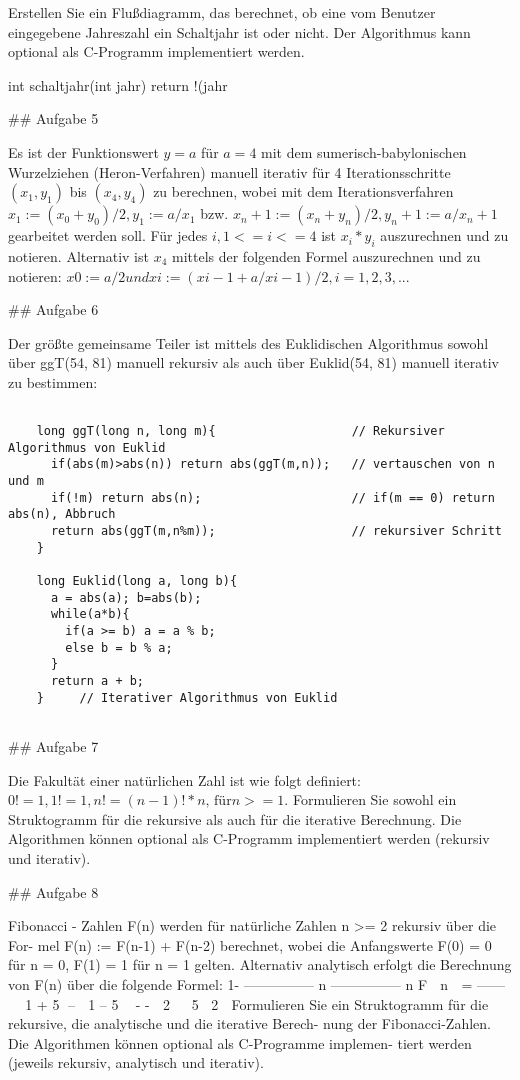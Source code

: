 Erstellen Sie ein Flußdiagramm, das berechnet, ob eine vom Benutzer eingegebene Jahreszahl ein Schaltjahr ist oder nicht. Der Algorithmus kann optional als C-Programm implementiert werden.

    int schaltjahr(int jahr){
      return !(jahr%
    }

## Aufgabe 5

Es ist der Funktionswert $ y = a $ für $ a = 4 $ mit dem sumerisch-babylonischen Wurzelziehen (Heron-Verfahren) manuell iterativ für 4 Iterationsschritte $ (x_1, y_1) $ bis $ (x_4, y_4) $ zu berechnen, wobei mit dem Iterationsverfahren $ x_1 := (x_0 + y_0) / 2 , y_1 := a / x_1 $ bzw. $ x_n+1 := (x_n + y_n) / 2 , y_n+1 := a / x_n+1 $ gearbeitet werden soll. Für jedes $ i, 1 <= i <= 4 $ ist $ x_i * y_i $ auszurechnen und zu notieren.
Alternativ ist $ x_4 $ mittels der folgenden Formel auszurechnen und zu notieren:
$ x0 := a / 2 und xi := ( xi-1 + a / xi-1 ) / 2 , i = 1, 2, 3, ... $

## Aufgabe 6

Der größte gemeinsame Teiler ist mittels des Euklidischen Algorithmus sowohl über ggT(54, 81) manuell rekursiv als auch über Euklid(54, 81) manuell iterativ zu bestimmen:

\begin{lstlisting}

    long ggT(long n, long m){                   // Rekursiver Algorithmus von Euklid
      if(abs(m)>abs(n)) return abs(ggT(m,n));   // vertauschen von n und m
      if(!m) return abs(n);                     // if(m == 0) return abs(n), Abbruch
      return abs(ggT(m,n%m));                   // rekursiver Schritt
    }

    long Euklid(long a, long b){
      a = abs(a); b=abs(b);
      while(a*b){
        if(a >= b) a = a % b;
        else b = b % a;
      }
      return a + b;
    }     // Iterativer Algorithmus von Euklid
    
\end{lstlisting}

## Aufgabe 7

Die Fakultät einer natürlichen Zahl ist wie folgt definiert: $ 0! = 1 , 1! = 1, n! = (n-1)! * n \text{, für} n >= 1$. Formulieren Sie sowohl ein Struktogramm für die rekursive als auch für die iterative Berechnung. Die Algorithmen können optional als C-Programm implementiert werden (rekursiv und iterativ).

## Aufgabe 8

Fibonacci - Zahlen F(n) werden für natürliche Zahlen n >= 2 rekursiv über die For-
mel F(n) := F(n-1) + F(n-2) berechnet, wobei die Anfangswerte F(0) = 0 für n = 0, F(1) = 1 für
n = 1 gelten. Alternativ analytisch erfolgt die Berechnung von F(n) über die folgende Formel:
1- --------------- n --------------- n
F  n  = ------   1 + 5 –  1 – 5 
-
-
 2  
5 2 
Formulieren Sie ein Struktogramm für die rekursive, die analytische und die iterative Berech-
nung der Fibonacci-Zahlen. Die Algorithmen können optional als C-Programme implemen-
tiert werden (jeweils rekursiv, analytisch und iterativ).


